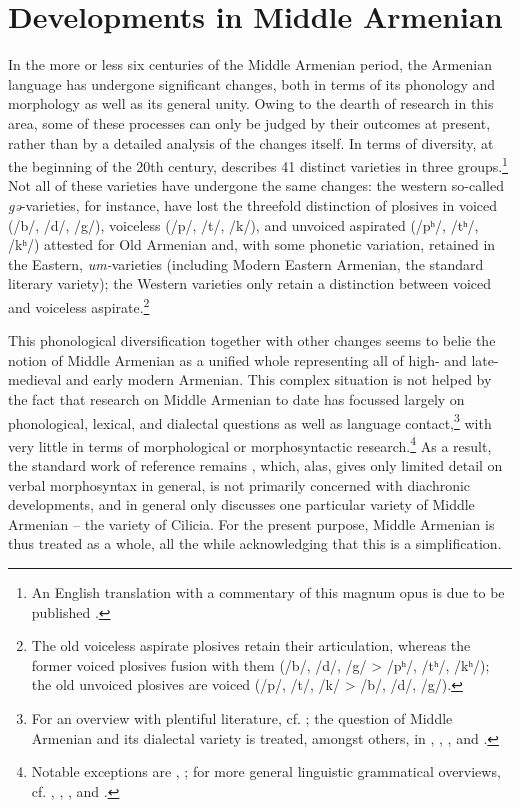 \documentclass[output=paper,colorlinks,citecolor=brown]{langscibook}
\begin{document}
	
	\section{Developments in Middle Armenian}\label{sec:meyer:marm}
	
	\largerpage[1.5]

	In the more or less six centuries of the Middle Armenian period, the Armenian language has undergone significant changes, both in terms of its phonology and morphology as well as its general unity. Owing to the dearth of research in this area, some of these processes can only be judged by their outcomes at present, rather than by a detailed analysis of the changes itself. In terms of diversity, at the beginning of the 20th century, \citet{Acarean1911} describes 41 distinct varieties in three groups.\footnote{An English translation with a commentary of this magnum opus is due to be published \citep{DolatianAdjarianfthc}.} Not all of these varieties have undergone the same changes: the western so-called \textit{gə}-varieties, for instance, have lost the threefold distinction of plosives in voiced (/b/, /d/, /g/), voiceless (/p/, /t/, /k/), and unvoiced aspirated (/pʰ/, /tʰ/, /kʰ/) attested for Old Armenian and, with some phonetic variation, retained in the Eastern, \textit{um-}varieties (including Modern Eastern Armenian, the standard literary variety); the Western varieties only retain a distinction between voiced and voiceless aspirate.\footnote{The old voiceless aspirate plosives retain their articulation, whereas the former voiced plosives fusion with them (/b/, /d/, /g/ > /pʰ/, /tʰ/, /kʰ/); the old unvoiced plosives are voiced (/p/, /t/, /k/ > /b/, /d/, /g/).}
	
	This phonological diversification together with other changes seems to belie the notion of Middle Armenian as a unified whole representing all of high- and late-medieval and early modern Armenian. This complex situation is not helped by the fact that research on Middle Armenian to date has focussed largely on phonological, lexical, and dialectal questions as well as language contact,\footnote{For an overview with plentiful literature, cf. \citet{vanLintfthc}; the question of Middle Armenian and its dialectal variety is treated, amongst others, in \citet{Jahukyan1993},  \citet{Mkrtcyan2018},  \citet{Muradyan1975},  \citet{Weitenberg1996} and \citet{Weitenberg2017}.} with very little in terms of morphological or morphosyntactic research.\footnote{Notable exceptions are \citet{Antosyan1972}, \citet{Antosyan1975}; for more general linguistic grammatical overviews, cf. \citet{Alayan1972}, \citet{Hovsepyan1975}, \citet{Jahukyan1964}, \citet{Jahukyan1975} and  \citet{Lazaryan1960}.} As a result, the standard work of reference remains \citet{Karst1901}, which, alas, gives only limited detail on verbal morphosyntax in general, is not primarily concerned with diachronic developments, and in general only discusses one particular variety of Middle Armenian -- the variety of Cilicia. For the present purpose, Middle Armenian is thus treated as a whole, all the while acknowledging that this is a simplification.
	
\end{document}

